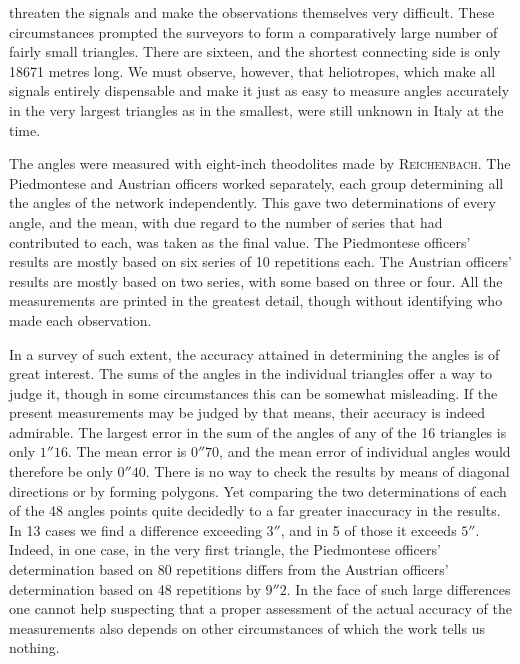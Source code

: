 %
threaten the signals and make the observations themselves very difficult. These circumstances prompted the surveyors to form a comparatively large number of fairly small triangles. There are sixteen, and the shortest connecting side is only 18671 metres long. We must observe, however, that heliotropes, which make all signals entirely dispensable and make it just as easy to measure angles accurately in the very largest triangles as in the smallest, were still unknown in Italy at the time.

The angles were measured with eight-inch theodolites made by \textsc{Reichenbach}. The Piedmontese and Austrian officers worked separately, each group determining all the angles of the network independently. This gave two determinations of every angle, and the mean, with due regard to the number of series that had contributed to each, was taken as the final value. The Piedmontese officers' results are mostly based on six series of 10 repetitions each. The Austrian officers' results are mostly based on two series, with some based on three or four. All the measurements are printed in the greatest detail, though without identifying who made each observation.

In a survey of such extent, the accuracy attained in determining the angles is of great interest. The sums of the angles in the individual triangles offer a way to judge it, though in some circumstances this can be somewhat misleading. If the present measurements may be judged by that means, their accuracy is indeed admirable. The largest error in the sum of the angles of any of the 16 triangles is only \(1''16\). The mean error is \(0''70\), and the mean error of individual angles would therefore be only \(0''40\). There is no way to check the results by means of diagonal directions or by forming polygons. Yet comparing the two determinations of each of the 48 angles points quite decidedly to a far greater inaccuracy in the results. In 13 cases we find a difference exceeding \(3''\), and in 5 of those it exceeds \(5''\). Indeed, in one case, in the very first triangle, the Piedmontese officers' determination based on 80 repetitions differs from the Austrian officers' determination based on 48 repetitions by \(9''2\). In the face of such large differences one cannot help suspecting that a proper assessment of the actual accuracy of the measurements also depends on other circumstances of which the work tells us nothing.

